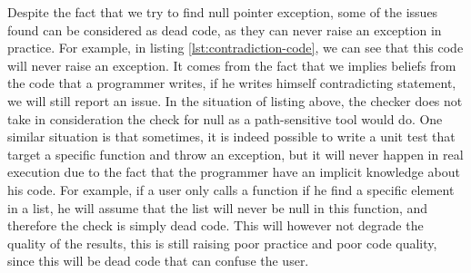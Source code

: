 Despite the fact that we try to find null pointer exception, some of the issues found can be considered as dead code, as they can never raise an exception in practice. 
For example, in listing \ref{lst:contradiction-code}, we can see that this code will never raise an exception. 
It comes from the fact that we implies beliefs from the code that a programmer writes, if he writes himself contradicting statement, we will still report an issue. 
In the situation of listing above, the checker does not take in consideration the check for null as a path-sensitive tool would do. \newline
One similar situation is that sometimes, it is indeed possible to write a unit test that target a specific function and throw an exception, but it will never happen in real execution due to the fact that the programmer have an implicit knowledge about his code. 
For example, if a user only calls a function if he find a specific element in a list, he will assume that the list will never be null in this function, and therefore the check is simply dead code. 
This will however not degrade the quality of the results, this is still raising poor practice and poor code quality, since this will be dead code that can confuse the user.










